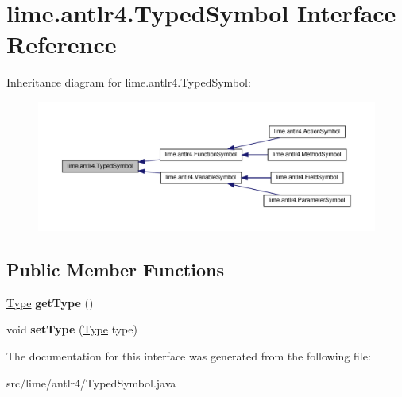 \hypertarget{interfacelime_1_1antlr4_1_1TypedSymbol}{}\section{lime.\+antlr4.\+Typed\+Symbol Interface Reference}
\label{interfacelime_1_1antlr4_1_1TypedSymbol}


Inheritance diagram for lime.\+antlr4.\+Typed\+Symbol\+:
\nopagebreak
\begin{figure}[H]
\begin{center}
\leavevmode
\includegraphics[width=350pt]{interfacelime_1_1antlr4_1_1TypedSymbol__inherit__graph}
\end{center}
\end{figure}
\subsection*{Public Member Functions}
\begin{DoxyCompactItemize}
\item 
\mbox{\label{interfacelime_1_1antlr4_1_1TypedSymbol_a7f5dad5b4a4621ec5dfcb626e7f95eaf}} 
\hyperlink{interfacelime_1_1antlr4_1_1Type}{Type} {\bfseries get\+Type} ()
\item 
\mbox{\label{interfacelime_1_1antlr4_1_1TypedSymbol_a639105929a0f4be7989ebac86ec27041}} 
void {\bfseries set\+Type} (\hyperlink{interfacelime_1_1antlr4_1_1Type}{Type} type)
\end{DoxyCompactItemize}


The documentation for this interface was generated from the following file\+:\begin{DoxyCompactItemize}
\item 
src/lime/antlr4/Typed\+Symbol.\+java\end{DoxyCompactItemize}
